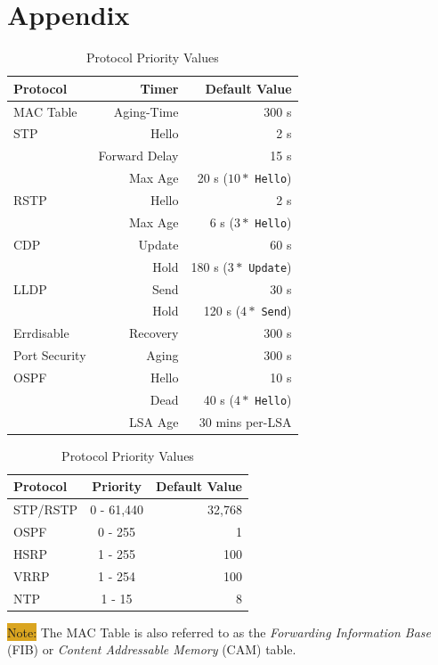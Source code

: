 \documentclass[12pt]{article}
\newcommand{\note}[1]{\colorbox{#1}{Note:}}
\begin{document}
\section{Appendix \label{sec:APPENDIX}}
	\begin{table}[H]
	\begin{minipage}{.55\linewidth}
	\centering
	\caption{Protocol Timers \label{tab:DEFAULT TIMERS}}
	\begin{tabular}{lrr}
	\hline
	\textbf{Protocol}		& \textbf{Timer}	& \textbf{Default Value}\\\hline
	MAC Table 			& Aging-Time	& 300 s\\\hline
	STP				& Hello		& 2 s\\
					& Forward Delay	& 15 s\\
					& Max Age		& 20 s ($10*$ \texttt{Hello})\\\hline
	RSTP				& Hello		& 2 s\\
					& Max Age		& 6 s ($3*$ \texttt{Hello})\\\hline
	CDP				& Update		& 60 s\\
					& Hold		& 180 s ($3*$ \texttt{Update})\\\hline
	LLDP				& Send		& 30 s\\
					& Hold		& 120 s ($4*$ \texttt{Send})\\\hline
	Errdisable			& Recovery 	& 300 s\\\hline
	Port Security		& Aging		& 300 s\\\hline
	OSPF				& Hello		& 10 s\\
					& Dead		& 40 s ($4*$ \texttt{Hello})\\
					& LSA Age		& 30 mins per-LSA\\\hline
	\end{tabular}\end{minipage}\hfill
	\begin{minipage}{.45\linewidth}
	\centering
	\caption{Protocol Priority Values\label{tab:DEFAULT PRIORITIES}}
	\begin{tabular}{lcr}
	\hline
	\textbf{Protocol}		& \textbf{Priority}		& \textbf{Default Value}\\\hline
	STP/RSTP			& 0 - 61,440			& 32,768\\\hline
	OSPF				& 0 - 255			& 1\\\hline
	HSRP				& 1 - 255			& 100\\\hline
	VRRP				& 1 - 254			& 100\\\hline
	NTP				& 1 - 15			& 8\\\hline
	\end{tabular}\end{minipage}\end{table}
	\note{Goldenrod} The MAC Table is also referred to as the \textit{Forwarding Information Base} (FIB) or \textit{Content Addressable Memory} (CAM) table.
\end{document}
